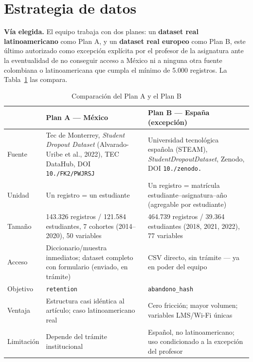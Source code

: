 \documentclass[11pt,a4paper]{article}
\newcommand{\dt}{.\allowbreak}
\newcommand{\us}{\_\allowbreak}
\newcommand{\slsh}{/\allowbreak}
\begin{document}
\section{Estrategia de datos}

\textbf{Vía elegida.} El equipo trabaja con dos planes: un \textbf{dataset real latinoamericano} como Plan A, y un \textbf{dataset real europeo} como Plan B, este último autorizado como excepción explícita por el profesor de la asignatura ante la eventualidad de no conseguir acceso a México ni a ninguna otra fuente colombiana o latinoamericana que cumpla el mínimo de 5.000 registros. La Tabla~\ref{tab:fuentes} las compara.

\begin{table}[h!]
\centering
\footnotesize
\caption{Comparación del Plan A y el Plan B}
\label{tab:fuentes}
\begin{tabular}{p{1.9cm}p{4.7cm}p{4.9cm}}
\toprule
 & \textbf{Plan A --- México} & \textbf{Plan B --- España (excepción)} \\
\midrule
Fuente & Tec de Monterrey, \textit{Student Dropout Dataset} (Alvarado-Uribe et al., 2022), TEC DataHub, DOI \texttt{10\dt 57687\slsh FK2\slsh PWJRSJ} & Universidad tecnológica española (STEAM), \textit{StudentDropoutDataset}, Zenodo, DOI \texttt{10\dt 5281\slsh zenodo\dt 17239943} \\
Unidad & Un registro = un estudiante & Un registro = matrícula estudiante--asignatura--año (agregable por estudiante) \\
Tamaño & 143.326 registros / 121.584 estudiantes, 7 cohortes (2014--2020), 50 variables & 464.739 registros / 39.364 estudiantes (2018, 2021, 2022), 77 variables \\
Acceso & Diccionario/muestra inmediatos; dataset completo con formulario (enviado, en trámite) & CSV directo, sin trámite --- ya en poder del equipo \\
Objetivo & \texttt{retention} & \texttt{abandono\us hash} \\
Ventaja & Estructura casi idéntica al artículo; caso latinoamericano real & Cero fricción; mayor volumen; variables LMS/Wi-Fi únicas \\
Limitación & Depende del trámite institucional & Español, no latinoamericano; uso condicionado a la excepción del profesor \\
\bottomrule
\end{tabular}
\end{table}
\end{document}
